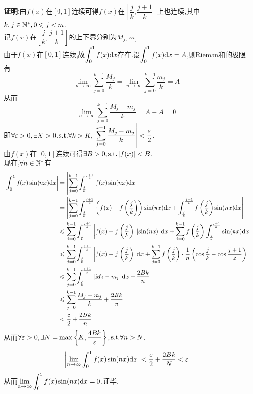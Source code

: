 \documentclass{ctexart}
\begin{document}
\begin{solution}
    \textbf{证明:}由$f(x)$在$[0,1]$连续可得$f(x)$在$\left[\dfrac{j}{k},\dfrac{j+1}{k}\right]$上也连续,其中$k,j\in\mathbb{N}^*,0\leqslant j<m$.\\
    记$f(x)$在$\left[\dfrac{j}{k},\dfrac{j+1}{k}\right]$的上下界分别为$M_j,m_j$.\\
    由于$f(x)$在$[0,1]$连续,故$\displaystyle\int_{0}^{1}{f(x)\mathrm{d} x}$存在.设$\displaystyle\int_{0}^{1}{f(x)\mathrm{d} x}=A$,则Rieman和的极限有
    $$\lim_{n\to\infty}{\sum_{j=0}^{k-1}{\dfrac{M_j}{k}}}=\lim_{n\to\infty}{\sum_{j=0}^{k-1}{\dfrac{m_j}{k}}}=A$$
    从而$$\lim_{n\to\infty}{\sum_{j=0}^{k-1}{\dfrac{M_j-m_j}{k}}}=A-A=0$$
    即$\displaystyle\forall\varepsilon>0,\exists K>0,\text{s.t.}\forall k>K,\left|\sum_{j=0}^{k-1}{\dfrac{M_j-m_j}{k}}\right|<\dfrac{\varepsilon}{2}$.\\
    由$f(x)$在$[0,1]$连续可得$\exists B>0,\text{s.t.}\left|f(x)\right|<B$.\\
    现在,$\forall n\in\mathbb{N}^*$有
    \begin{align*}
        \left|\int_{0}^{1}{f(x)\sin(nx)\mathrm{d} x}\right|
        &= \left|\sum_{j=0}^{k-1}{\int_{\frac{j}{k}}^{\frac{j+1}{k}}{f(x)\sin(nx)\mathrm{d} x}}\right| \\
        &= \left|\sum_{j=0}^{k-1}{\int_{\frac{j}{k}}^{\frac{j+1}{k}}{\left(f(x)-f\left(\dfrac{j}{k}\right)\right)\sin(nx)\mathrm{d} x}}+\int_{\frac{j}{k}}^{\frac{j+1}{k}}{f\left(\dfrac{j}{k}\right)\sin(nx)\mathrm{d} x}\right| \\
        &\leqslant \sum_{j=0}^{k-1}{\int_{\frac{j}{k}}^{\frac{j+1}{k}}{\left|f(x)-f\left(\dfrac{j}{k}\right)\right|\left|\sin(nx)\right|\mathrm{d} x}}+\sum_{j=0}^{k-1}{f\left(\dfrac{j}{k}\right)\int_{\frac{j}{k}}^{\frac{j+1}{k}}{\sin(nx)\mathrm{d} x}} \\
        &\leqslant \sum_{j=0}^{k-1}{\int_{\frac{j}{k}}^{\frac{j+1}{k}}{\left|f(x)-f\left(\dfrac{j}{k}\right)\right|\mathrm{d} x}}+\sum_{j=0}^{k-1}{f\left(\dfrac{j}{k}\right)\cdot\dfrac{1}{n}\left(\cos{\dfrac{j}{k}}-\cos{\dfrac{j+1}{k}}\right)} \\
        &\leqslant \sum_{j=0}^{k-1}{\int_{\frac{j}{k}}^{\frac{j+1}{k}}{\left|M_j-m_j\right|\mathrm{d} x}}+\dfrac{2Bk}{n} \\
        &\leqslant \sum_{j=0}^{k-1}{\dfrac{M_j-m_j}{k}}+\dfrac{2Bk}{n} \\
        &< \dfrac{\varepsilon}{2}+\dfrac{2Bk}{n}
    \end{align*}
    从而$\forall\varepsilon>0,\exists N=\max\left\{K,\dfrac{4Bk}{\varepsilon}\right\},\text{s.t.}\forall n>N$,
    $$\left|\lim_{n\to\infty}{\int_{0}^{1}{f(x)\sin(nx)\mathrm{d} x}}\right|<\dfrac{\varepsilon}{2}+\dfrac{2Bk}{N}<\varepsilon$$
    从而$\displaystyle\lim_{n\to\infty}{\int_{0}^{1}{f(x)\sin(nx)\mathrm{d} x}}=0$,证毕.
\end{solution}
\end{document}
